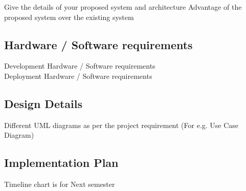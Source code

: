 Give the details of your proposed system and architecture 
Advantage of the proposed system over the existing system

\subsection{Hardware / Software requirements}
Development Hardware / Software requirements \\
Deployment Hardware / Software requirements \\

\subsection{Design Details}

Different UML diagrams as per the project requirement (For e.g. Use Case Diagram)

\subsection{Implementation Plan}

Timeline chart is for Next semester
